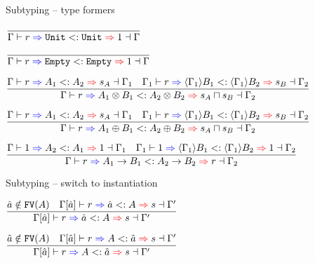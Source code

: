\documentclass{beamer}
\begin{document}
\begin{frame}{Subtyping -- type formers}

\begin{center}
  $\infrule{}{\subtyping{\Gamma}{r}{\Unit}{\Unit}{\One}{\Gamma}}$

  \vspace{2em}

  $\infrule{}{\subtyping{\Gamma}{r}{\Empty}{\Empty}{\One}{\Gamma}}$

  \vspace{2em}

  $\infrule{\subtyping{\Gamma}{r}{A_1}{A_2}{s_A}{\Gamma_1} \quad \subtyping{\Gamma_1}{r}{\substctx{\Gamma_1}{B_1}}{\substctx{\Gamma_1}{B_2}}{s_B}{\Gamma_2}}{\subtyping{\Gamma}{r}{\Prod{A_1}{B_1}}{\Prod{A_2}{B_2}}{\glbqty{s_A}{s_B}}{\Gamma_2}}$

  \vspace{2em}

  $\infrule{\subtyping{\Gamma}{r}{A_1}{A_2}{s_A}{\Gamma_1} \quad \subtyping{\Gamma_1}{r}{\substctx{\Gamma_1}{B_1}}{\substctx{\Gamma_1}{B_2}}{s_B}{\Gamma_2}}{\subtyping{\Gamma}{r}{\Sum{A_1}{B_1}}{\Sum{A_2}{B_2}}{\glbqty{s_A}{s_B}}{\Gamma_2}}$

  \vspace{2em}

  $\infrule{\subtyping{\Gamma}{\One}{A_2}{A_1}{\One}{\Gamma_1} \quad \subtyping{\Gamma_1}{\One}{\substctx{\Gamma_1}{B_1}}{\substctx{\Gamma_1}{B_2}}{\One}{\Gamma_2}}{\subtyping{\Gamma}{r}{\Fun{A_1}{B_1}}{\Fun{A_2}{B_2}}{r}{\Gamma_2}}$
\end{center}

\end{frame}

\begin{frame}{Subtyping -- switch to instantiation}

\begin{center}
  $\infrule{\evar{a} \notin \FV{A} \quad \subinst{\holectx{\Gamma}{\evar{a}}}{r}{\evar{a}}{A}{s}{\Gamma'}}{\subtyping{\holectx{\Gamma}{\evar{a}}}{r}{\evar{a}}{A}{s}{\Gamma'}}$

  \vspace{2em}

  $\infrule{\evar{a} \notin \FV{A} \quad \superinst{\holectx{\Gamma}{\evar{a}}}{r}{A}{\evar{a}}{s}{\Gamma'}}{\subtyping{\holectx{\Gamma}{\evar{a}}}{r}{A}{\evar{a}}{s}{\Gamma'}}$
\end{center}

\end{frame}
\end{document}
